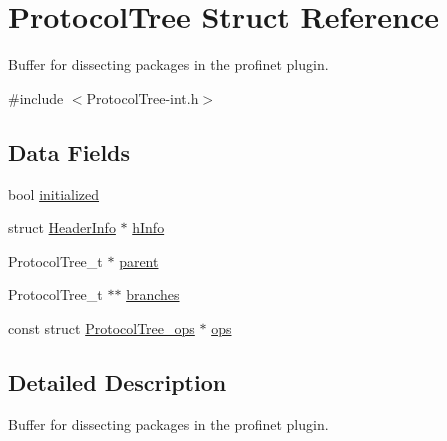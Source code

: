 \hypertarget{struct_protocol_tree}{\section{Protocol\-Tree Struct Reference}
\label{struct_protocol_tree}
}


Buffer for dissecting packages in the profinet plugin.  




{\ttfamily \#include $<$Protocol\-Tree-\/int.\-h$>$}

\subsection*{Data Fields}
\begin{DoxyCompactItemize}
\item 
bool \hyperlink{struct_protocol_tree_a6d4f209acc4331cbb440df967d7a4054}{initialized}
\item 
struct \hyperlink{struct_header_info}{Header\-Info} $\ast$ \hyperlink{struct_protocol_tree_a8fce6fc18afa7ddd1fa4f8895064d1ba}{h\-Info}
\item 
Protocol\-Tree\-\_\-t $\ast$ \hyperlink{struct_protocol_tree_a4d7aa1ac9fb932c4a4a7ebc140066ab1}{parent}
\item 
Protocol\-Tree\-\_\-t $\ast$$\ast$ \hyperlink{struct_protocol_tree_aab7be83543870f7313efbec39b72385f}{branches}
\item 
const struct \hyperlink{struct_protocol_tree__ops}{Protocol\-Tree\-\_\-ops} $\ast$ \hyperlink{struct_protocol_tree_aad4c24f365eae4e59887dc5753a0d891}{ops}
\end{DoxyCompactItemize}


\subsection{Detailed Description}
Buffer for dissecting packages in the profinet plugin. 

